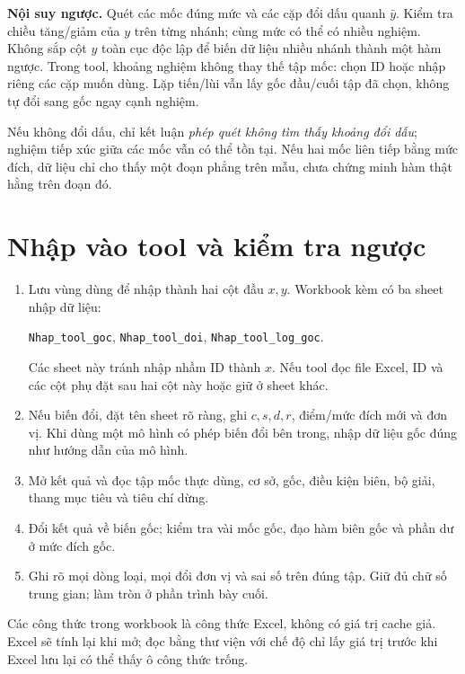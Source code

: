 \documentclass[11pt,a4paper]{article}
\begin{document}
\textbf{Nội suy ngược.} Quét các mốc đúng mức và các cặp đổi dấu quanh $\bar y$.
Kiểm tra chiều tăng/giảm của $y$ trên từng nhánh; cùng mức có thể có nhiều nghiệm.
Không sắp cột $y$ toàn cục độc lập để biến dữ liệu nhiều nhánh thành một hàm ngược.
Trong tool, khoảng nghiệm không thay thế tập mốc: chọn ID hoặc nhập riêng các cặp muốn dùng.
Lặp tiến/lùi vẫn lấy gốc đầu/cuối tập đã chọn, không tự đổi sang gốc ngay cạnh nghiệm.

Nếu không đổi dấu, chỉ kết luận \emph{phép quét không tìm thấy khoảng đổi dấu}; nghiệm tiếp xúc giữa các mốc vẫn có thể tồn tại.
Nếu hai mốc liên tiếp bằng mức đích, dữ liệu chỉ cho thấy một đoạn phẳng trên mẫu, chưa chứng minh hàm thật hằng trên đoạn đó.

\section{Nhập vào tool và kiểm tra ngược}
\begin{enumerate}
\item Lưu vùng dùng để nhập thành hai cột đầu $x,y$. Workbook kèm có ba sheet nhập dữ liệu:\par
\texttt{Nhap\_tool\_goc}, \texttt{Nhap\_tool\_doi}, \texttt{Nhap\_tool\_log\_goc}.\par
Các sheet này tránh nhập nhầm ID thành $x$. Nếu tool đọc file Excel, ID và các cột phụ đặt sau hai cột này hoặc giữ ở sheet khác.
\item Nếu biến đổi, đặt tên sheet rõ ràng, ghi $c,s,d,r$, điểm/mức đích mới và đơn vị. Khi dùng một mô hình có phép biến đổi bên trong, nhập dữ liệu gốc đúng như hướng dẫn của mô hình.
\item Mở kết quả và đọc tập mốc thực dùng, cơ sở, gốc, điều kiện biên, bộ giải, thang mục tiêu và tiêu chí dừng.
\item Đổi kết quả về biến gốc; kiểm tra vài mốc gốc, đạo hàm biên gốc và phần dư ở mức đích gốc.
\item Ghi rõ mọi dòng loại, mọi đổi đơn vị và sai số trên đúng tập. Giữ đủ chữ số trung gian; làm tròn ở phần trình bày cuối.
\end{enumerate}
Các công thức trong workbook là công thức Excel, không có giá trị cache giả. Excel sẽ tính lại khi mở; đọc bằng thư viện với chế độ chỉ lấy giá trị trước khi Excel lưu lại có thể thấy ô công thức trống.
\end{document}

